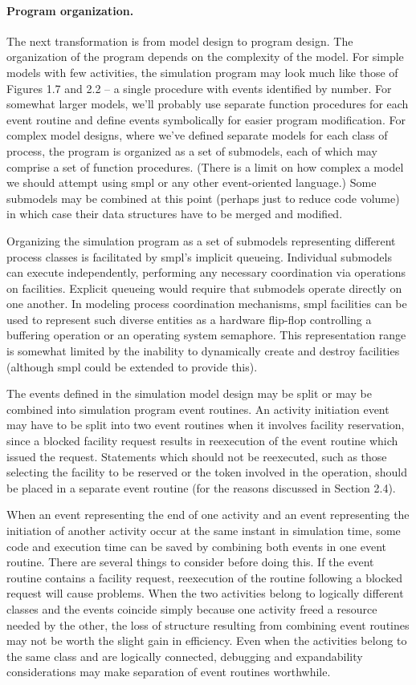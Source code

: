 \paragraph{Program organization.}
The next transformation is from model design to program design. The
organization of the program depends on the complexity of the model. For
simple models with few activities, the simulation program may look much like
those of Figures 1.7 and 2.2 -- a single procedure with events identified by
number. For somewhat larger models, we'll probably use separate function
procedures for each event routine and define events symbolically for easier
program modification. For complex model designs, where we've defined separate
models for each class of process, the program is organized as a set of
submodels, each of which may comprise a set of function procedures. (There is
 a limit on how complex a model we should attempt using smpl or any other
event-oriented language.) Some submodels may be combined at this point
(perhaps just to reduce code volume) in which case their data structures have
to be merged and modified.

Organizing the simulation program as a set of submodels representing different
process classes is facilitated by smpl's implicit queueing. Individual
submodels can execute independently, performing any necessary coordination
via operations on facilities. Explicit queueing would require that submodels
operate directly on one another. In modeling process coordination mechanisms,
smpl facilities can be used to represent such diverse entities as a hardware
flip-flop controlling a buffering operation or an operating system semaphore.
This representation range is somewhat limited by the inability to dynamically
create and destroy facilities (although smpl could be extended to provide
this).

The events defined in the simulation model design may be split or may be
combined into simulation program event routines. An activity initiation event
may have to be split into two event routines when it involves facility
reservation, since a blocked facility request results in reexecution of the
event routine which issued the request. Statements which should not be
reexecuted, such as those selecting the facility to be reserved or the token
involved in the operation, should be placed in a separate event routine (for
the reasons discussed in Section 2.4).

When an event representing the end of one activity and an event representing
 the initiation of another activity occur at the same instant in simulation
time, some code and execution time can be saved by combining both events in
one event routine. There are several things to consider before doing this. If
the event routine contains a facility request, reexecution of the routine
following a blocked request will cause problems. When the two activities
belong to logically different classes and the events coincide simply because
one activity freed a resource needed by the other, the loss of structure
resulting from combining event routines may not be worth the slight gain in
efficiency. Even when the activities belong to the same class and are
logically connected, debugging and expandability considerations may make
separation of event routines worthwhile.

